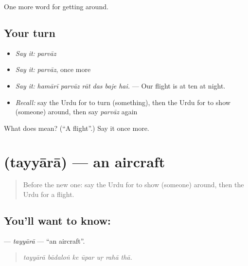 \begin{grammarlens}[title={What you've built}]
One more word for getting around.
\end{grammarlens}

\subsection*{Your turn}
\begin{itemize}
\raggedright
  \item \emph{Say it:} \emph{parvāz}
  \item \emph{Say it:} \emph{parvāz}, once more
  \item \emph{Say it:} \emph{hamārī parvāz rāt das baje hai.} — Our flight is at ten at night.
  \item \emph{Recall:} say the Urdu for to turn (something), then the Urdu for to show (someone) around, then say \emph{parvāz} again
\end{itemize}

\begin{tcolorbox}[breakable,colback=teal!4,colframe=teal!35!black,title={Before you move on}]
What does  mean? (\textquotedblleft{}A flight\textquotedblright{}.) Say it once more.
\end{tcolorbox}
\section[\texorpdfstring{\ur{طیارہ} (tayyārā)}{طیارہ (tayyārā)}]{ (tayyārā) — an aircraft}

\label{lesson:UR-C398-tayyara}



\begin{quote}
Before the new one: say the Urdu for to show (someone) around, then the Urdu for a flight.
\end{quote}

\subsection*{You'll want to know: }
\textbf{} — \emph{tayyārā} — \textquotedblleft{}an aircraft\textquotedblright{}.

\begin{quote}
      
\end{quote}

\begin{quote}
\emph{tayyārā bādaloṅ ke ūpar uṛ rahā thā.}
\end{quote}

